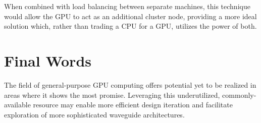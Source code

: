 When combined with load balancing between separate machines, this technique would allow the GPU to act as an additional cluster node, providing a more ideal solution which, rather than trading a CPU for a GPU, utilizes the power of both. 

\iffalse
\subsection{Machine Learning}
A high-speed simulator such as GoLightly may facilitate application of machine learning algorithms to accelerate FDTD even more. ML systems excel at identifying complex relationships and patterns. In theory, one could present simulation parameters such as waveguide architecture and composition and source wavelengths as a set of inputs into a multi-layer neural network, while simulation output is used to evaluate the fidelity of the network's predicted output. 

A trained network may be able to predict a simulation's output with a degree of accuracy sufficient to inform the design iteration process.  The ability to rapidly execute simulations should make generation of the large quantities of training data required by ML networks more feasible than traditional CPU-based systems. 
\fi

\section{Final Words}

The field of general-purpose GPU computing offers potential yet to be realized in areas where it shows the most promise. Leveraging this underutilized, commonly-available resource may enable more efficient design iteration and facilitate exploration of more sophisticated waveguide architectures. 









